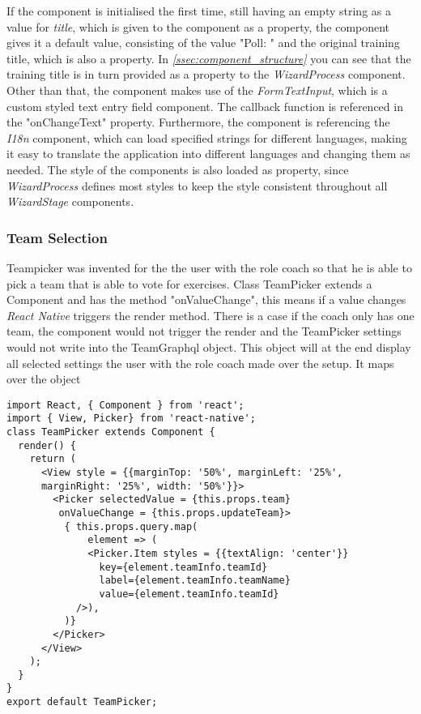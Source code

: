 If the component is initialised the first time, still having an empty string as a value for \textit{title}, which is given to the component as a property, the component gives it a default value, consisting of the value "Poll: " and the original training title, which is also a property. In \textit{\ref{ssec:component_structure} } you can see that the training title is in turn provided as a property to the \textit{WizardProcess} component.
\newline
Other than that, the component makes use of the \textit{FormTextInput}, which is a custom styled text entry field component. The callback function is referenced in the "onChangeText" property. Furthermore, the component is referencing the \textit{I18n} component, which can load specified strings for different languages, making it easy to translate the application into different languages and changing them as needed. The style of the components is also loaded as property, since \textit{WizardProcess} defines most styles to keep the style consistent throughout all \textit{WizardStage} components.

\subsubsection{Team Selection}
\label{sssec:poll_team}

Teampicker was invented for the the user with the role coach so that he is able to pick a team that is able to vote for exercises. Class TeamPicker extends a Component and has the method "onValueChange", this means if a value changes \textit{React Native} triggers the render method. There is a case if the coach only has one team, the component would not trigger the render and the TeamPicker settings would not write into the TeamGraphql object. This object will at the end display all selected settings the user with the role coach made over the setup. It maps over the object 

\begin{lstlisting}
import React, { Component } from 'react';
import { View, Picker} from 'react-native';
class TeamPicker extends Component {
  render() {
    return (
      <View style = {{marginTop: '50%', marginLeft: '25%',
      marginRight: '25%', width: '50%'}}>
        <Picker selectedValue = {this.props.team}
         onValueChange = {this.props.updateTeam}>
          { this.props.query.map(
              element => (
              <Picker.Item styles = {{textAlign: 'center'}}
                key={element.teamInfo.teamId}
                label={element.teamInfo.teamName}
                value={element.teamInfo.teamId}
            />),
          )}
        </Picker>
      </View>
    );
  }
}
export default TeamPicker;
\end{lstlisting}


